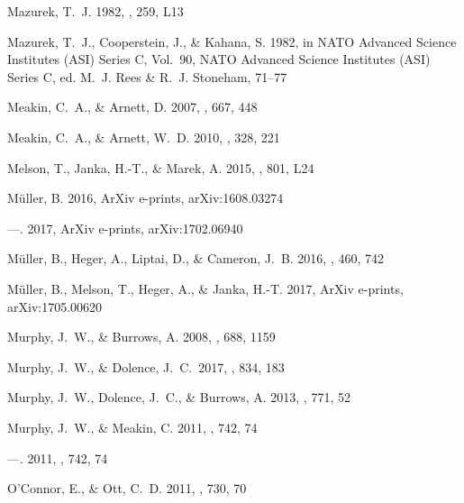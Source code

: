 \documentclass[twocolumn]{aastex6}
\begin{document}
\begin{thebibliography}{}
{Mazurek}, T.~J. 1982, \apjl, 259, L13

{Mazurek}, T.~J., {Cooperstein}, J., \& {Kahana}, S. 1982, in NATO Advanced
  Science Institutes (ASI) Series C, Vol.~90, NATO Advanced Science Institutes
  (ASI) Series C, ed. M.~J. {Rees} \& R.~J. {Stoneham}, 71--77

{Meakin}, C.~A., \& {Arnett}, D. 2007, \apj, 667, 448

{Meakin}, C.~A., \& {Arnett}, W.~D. 2010, \apss, 328, 221

{Melson}, T., {Janka}, H.-T., \& {Marek}, A. 2015, \apjl, 801, L24

{M{\"u}ller}, B. 2016, ArXiv e-prints, arXiv:1608.03274

---. 2017, ArXiv e-prints, arXiv:1702.06940

{M{\"u}ller}, B., {Heger}, A., {Liptai}, D., \& {Cameron}, J.~B. 2016, \mnras,
  460, 742

{M{\"u}ller}, B., {Melson}, T., {Heger}, A., \& {Janka}, H.-T. 2017, ArXiv
  e-prints, arXiv:1705.00620

{Murphy}, J.~W., \& {Burrows}, A. 2008, \apj, 688, 1159

 Murphy, J.~W., \& Dolence, J.~C.\ 2017, \apj, 834, 183 

{Murphy}, J.~W., {Dolence}, J.~C., \& {Burrows}, A. 2013, \apj, 771, 52

{Murphy}, J.~W., \& {Meakin}, C. 2011{}, \apj, 742, 74

---. 2011{}, \apj, 742, 74

{O'Connor}, E., \& {Ott}, C.~D. 2011, \apj, 730, 70


\end{thebibliography}
\end{document}
